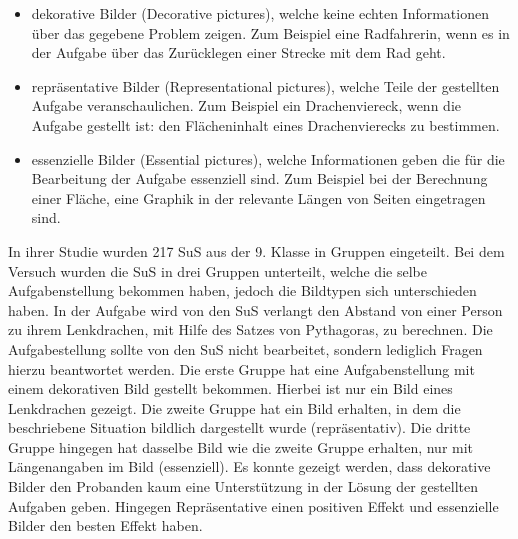     \begin{itemize}
        \item dekorative Bilder (Decorative pictures), welche keine echten Informationen über das gegebene Problem zeigen. Zum Beispiel eine Radfahrerin, wenn es in der Aufgabe über das Zurücklegen einer Strecke mit dem Rad geht.
        \item repräsentative Bilder (Representational pictures), welche Teile der gestellten Aufgabe veranschaulichen. Zum Beispiel ein Drachenviereck, wenn die Aufgabe gestellt ist: den Flächeninhalt eines Drachenvierecks zu bestimmen. 
        \item essenzielle Bilder (Essential pictures), welche Informationen geben die für die Bearbeitung der Aufgabe essenziell sind. Zum Beispiel bei der Berechnung einer Fläche, eine Graphik in der relevante Längen von Seiten eingetragen sind.
    \end{itemize}

In ihrer Studie wurden 217 SuS aus der 9. Klasse in Gruppen eingeteilt. Bei dem Versuch wurden die SuS in drei Gruppen unterteilt, welche die selbe Aufgabenstellung bekommen haben, jedoch die Bildtypen sich unterschieden haben. In der Aufgabe wird von den SuS verlangt den Abstand von einer Person zu ihrem Lenkdrachen, mit Hilfe des Satzes von Pythagoras, zu berechnen. Die Aufgabestellung sollte von den SuS nicht bearbeitet, sondern lediglich Fragen hierzu beantwortet werden. 
Die erste Gruppe hat eine Aufgabenstellung mit einem dekorativen Bild gestellt bekommen. Hierbei ist nur ein Bild eines Lenkdrachen gezeigt.
Die zweite Gruppe hat ein Bild erhalten, in dem die beschriebene Situation bildlich dargestellt wurde (repräsentativ). Die dritte Gruppe hingegen hat dasselbe Bild wie die zweite Gruppe erhalten, nur mit Längenangaben im Bild (essenziell).
Es konnte gezeigt werden, dass dekorative Bilder den Probanden kaum eine Unterstützung in der Lösung der gestellten Aufgaben geben. Hingegen Repräsentative einen positiven Effekt und essenzielle Bilder den besten Effekt haben\cite{bockmannvalue}.

